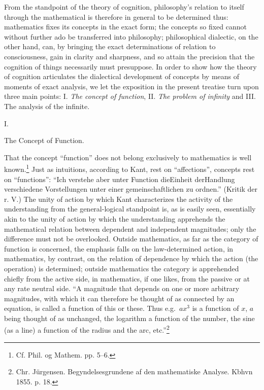 \documentclass[12pt,a4paper,openany]{book}
\newcommand{\opage}[1]{\marginnote{\footnotesize\textit{[#1]}}}
\begin{document}
From the standpoint of the theory of cognition, philosophy's
relation to itself through the mathematical is therefore in general
to be determined thus: mathematics fixes its
concepts in the exact form; the concepts so fixed
cannot without further ado be transferred into philosophy; philosophical
dialectic, on the other hand, can, by bringing the exact
determinations of relation to consciousness, gain in clarity and
sharpness, and so attain the precision that the
cognition of things necessarily must presuppose. In order to show
how the theory of cognition articulates the dialectical development of concepts
by means of moments of exact analysis, we let
the exposition in the present treatise turn upon three
main points: I. \emph{The concept of function}, II. \emph{The problem of infinity}
and III. The analysis of the infinite.

\setcounter{footnote}{0}%
\opage{4}
\begin{center}I.\end{center}
\begin{center}The Concept of Function.\end{center}

That the concept ``function'' does not belong exclusively
to mathematics is well known.\footnote[1]{Cf. Phil. og Mathem. pp. 5--6.} Just as intuitions, according to Kant,
rest on ``affections'', concepts rest on ``functions'':
``Ich verstehe aber unter Function dieEinheit derHandlung verschiedene
Vorstellungen unter einer gemeinschaftlichen zu ordnen.''
(Kritik der r. V.) The unity of action by which Kant
characterizes the activity of the understanding from the general-logical
standpoint is, as is easily seen, essentially akin
to the unity of action by which the understanding apprehends
the mathematical relation between dependent and independent
magnitudes; only the difference must not be overlooked. Outside mathematics,
as far as the category of function is concerned, the emphasis
falls on the law-determined action, in mathematics, by contrast, on
the relation of dependence by which the action (the operation)
is determined; outside mathematics the category is apprehended chiefly
from the active side, in mathematics, if one likes, from
the passive or at any rate neutral side. ``A magnitude that
depends on one or more arbitrary magnitudes, with which
it can therefore be thought of as connected by an equation, is called a
function of this or these. Thus e.g.\ $ax^{3}$ is a
function of $x$, $a$ being thought of as unchanged, the logarithm a
function of the number, the sine (as a line) a function of the radius
and the arc, etc.''\footnote[2]{Chr. Jürgensen. Begyndelsesgrundene af den mathematiske Analyse. Kbhvn 1855. p. 18.}
\end{document}
